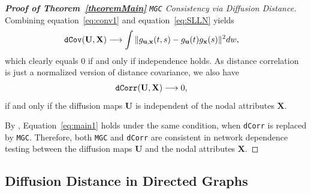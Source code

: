 \documentclass[11pt]{article}
\theoremstyle{definition}
\begin{document}
	
	\begin{proof}[\textbf{Proof of Theorem~\ref{theoremMain}} \texttt{MGC} Consistency via Diffusion Distance]
		
		Combining equation~\ref{eq:conv1} and equation~\ref{eq:SLLN} yields
		\begin{eqnarray}
		\mbox{\texttt{dCov}}(\mathbf{U},\mathbf{X}) &\longrightarrow \displaystyle\int{\|g_{\mathbf{u},\mathbf{x}}(t,s)-g_{\mathbf{u}}(t)g_{\mathbf{x}}(s)\|^{2}}dw,
		\label{eq:main2}
		\end{eqnarray}
		which clearly equals $0$ if and only if independence holds. As distance correlation is just a normalized version of distance covariance, we also have 
		\begin{eqnarray}
		\mbox{\texttt{dCorr}}(\mathbf{U},\mathbf{X}) &\longrightarrow 0,
		\label{eq:main1}
		\end{eqnarray}
		if and only if the diffusion maps $\mathbf{U}$ is independent of the nodal attributes $\mathbf{X}$.
		
		By \cite{shen2016discovering}, Equation~\ref{eq:main1} holds under the same condition, when \texttt{dCorr} is replaced by \texttt{MGC}. Therefore, both \texttt{MGC} and \texttt{dCorr} are consistent in network dependence testing between the diffusion maps $\mathbf{U}$ and the nodal attributes $\mathbf{X}$.
	\end{proof}
	
	\subsection{Diffusion Distance in Directed Graphs}
	\label{ssec:directed}
	
\end{document}
